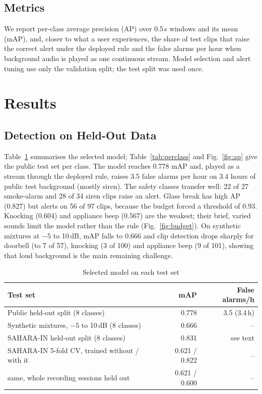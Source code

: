 \documentclass{svproc}
\begin{document}
\subsection{Metrics}
We report per-class average precision (AP) over 0.5\,s windows and its mean (mAP), and, closer to what a user experiences, the share of test clips that raise the correct alert under the deployed rule and the false alarms per hour when background audio is played as one continuous stream. Model selection and alert tuning use only the validation split; the test split was used once.

\section{Results}
\subsection{Detection on Held-Out Data}
Table~\ref{tab:sets} summarises the selected model; Table~\ref{tab:perclass} and Fig.~\ref{fig:ap} give the public test set per class. The model reaches 0.778 mAP and, played as a stream through the deployed rule, raises 3.5 false alarms per hour on 3.4 hours of public test background (mostly siren). The safety classes transfer well: 22 of 27 smoke-alarm and 28 of 34 siren clips raise an alert. Glass break has high AP (0.827) but alerts on 56 of 97 clips, because the budget forced a threshold of 0.93. Knocking (0.604) and appliance beep (0.567) are the weakest; their brief, varied sounds limit the model rather than the rule (Fig.~\ref{fig:budget}). On synthetic mixtures at $-5$ to 10\,dB, mAP falls to 0.666 and clip detection drops sharply for doorbell (to 7 of 57), knocking (3 of 100) and appliance beep (9 of 101), showing that loud background is the main remaining challenge.

\begin{table}[t]
\caption{Selected model on each test set}
\label{tab:sets}
\centering
\begin{tabular}{@{}lrr@{}}
\toprule
Test set & mAP & False alarms/h \\
\midrule
Public held-out split (8 classes) & 0.778 & 3.5 (3.4\,h) \\
Synthetic mixtures, $-5$ to 10\,dB (8 classes) & 0.666 & -- \\
SAHARA-IN held-out split (8 classes) & 0.831 & see text \\
SAHARA-IN 5-fold CV, trained without / with it & 0.621 / 0.822 & -- \\
\quad same, whole recording sessions held out & 0.621 / 0.600 & -- \\
\bottomrule
\end{tabular}
\end{table}
\end{document}
